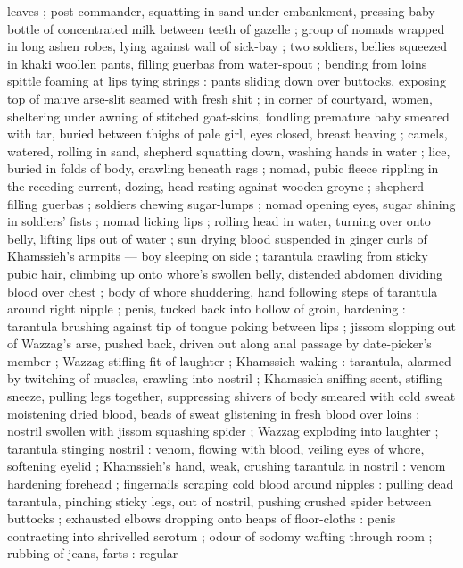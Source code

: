 leaves ; post-commander, squatting in sand under embankment, pressing baby-bottle of concentrated milk between teeth of gazelle ; group of nomads wrapped in long ashen robes, lying against wall of sick-bay ; two soldiers, bellies squeezed in khaki woollen pants, filling guerbas from water-spout ; bending from loins spittle foaming at lips tying strings : pants sliding down over buttocks, exposing top of mauve arse-slit seamed with fresh shit ; in corner of courtyard, women, sheltering under awning of stitched goat-skins, fondling premature baby smeared with tar, buried between thighs of pale girl, eyes closed, breast heaving ; camels, watered, rolling in sand, shepherd squatting down, washing hands in water ; lice, buried in folds of body, crawling beneath rags ; nomad, pubic fleece rippling in the receding current, dozing, head resting against wooden groyne ; shepherd filling guerbas ; soldiers chewing sugar-lumps ; nomad opening eyes, sugar shining in soldiers' fists ; nomad licking lips ; rolling head in water, turning over onto belly, lifting lips out of water{\td}  ; sun drying blood suspended in ginger curls of Khamssieh's armpits --- boy sleeping on side ; tarantula crawling from sticky pubic hair, climbing up onto whore's swollen belly, distended abdomen dividing blood over chest ; body of whore shuddering, hand following steps of tarantula around right nipple  ; penis, tucked back into hollow of groin, hardening : tarantula brushing against tip of tongue poking between lips ; jissom slopping out of Wazzag's arse, pushed back, driven out along anal passage by date-picker's member ; Wazzag stifling fit of laughter ; Khamssieh waking : tarantula, alarmed by twitching of muscles, crawling into nostril ; Khamssieh sniffing scent, stifling sneeze, pulling legs together, suppressing shivers of body smeared with cold sweat moistening dried blood, beads of sweat glistening in fresh blood over loins ; nostril swollen with jissom squashing spider ; Wazzag exploding into laughter ; tarantula stinging nostril : venom, flowing with blood, veiling eyes of whore, softening eyelid ; Khamssieh's hand, weak, crushing tarantula in nostril : venom hardening forehead ; fingernails scraping cold blood
around nipples : pulling dead tarantula, pinching sticky legs, out of nostril, pushing crushed
spider between buttocks ; exhausted elbows dropping onto heaps of floor-cloths : penis contracting
into shrivelled scrotum ; odour of sodomy wafting through room ; rubbing of jeans, farts : regular
